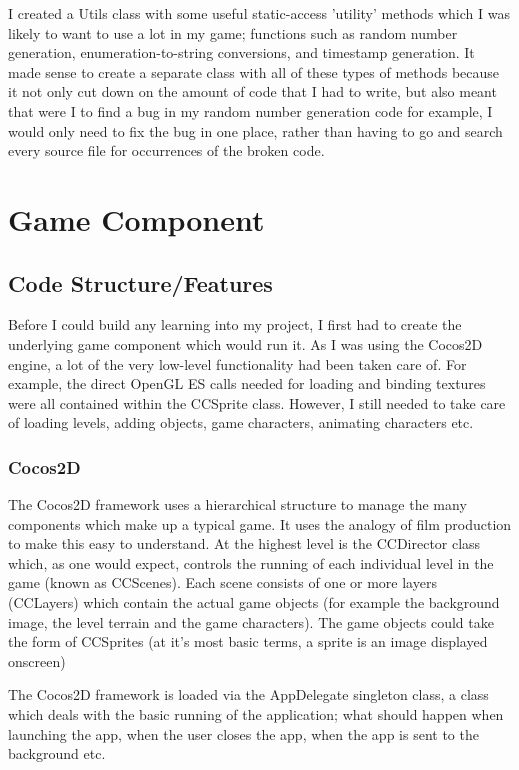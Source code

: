 \documentclass[a4paper,oneside]{report}
\begin{document}
I created a Utils class with some useful static-access 'utility' methods which I was likely to want to use a lot in my game; functions such as random number generation, enumeration-to-string conversions, and timestamp generation. It made sense to create a separate class with all of these types of methods because it not only cut down on the amount of code that I had to write, but also meant that were I to find a bug in my random number generation code for example, I would only need to fix the bug in one place, rather than having to go and search every source file for occurrences of the broken code. 

\chapter{Game Component}
		
\section{Code Structure/Features}

Before I could build any learning into my project, I first had to create the underlying game component which would run it. As I was using the Cocos2D engine, a lot of the very low-level functionality had been taken care of. For example, the direct OpenGL ES calls needed for loading and binding textures were all contained within the CCSprite class. However, I still needed to take care of loading levels, adding objects, game characters, animating characters etc.

\subsection{Cocos2D} 

The Cocos2D framework uses a hierarchical structure to manage the many components which make up a typical game. It uses the analogy of film production to make this easy to understand. At the highest level is the CCDirector class which, as one would expect, controls the running of each individual level in the game (known as CCScenes). Each scene consists of one or more  layers (CCLayers) which contain the actual game objects (for example the background image, the level terrain and the game characters). The game objects could take the form of CCSprites (at it's most basic terms, a sprite is an image displayed onscreen)

The Cocos2D framework is loaded via the AppDelegate singleton class, a class which deals with the basic running of the application; what should happen when launching the app, when the user closes the app, when the app is sent to the background etc.
\end{document}
